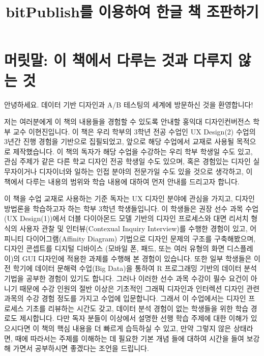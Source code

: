 \documentclass[
  letterpaper,
  DIV=11,
  numbers=noendperiod]{scrreprt}
\title{bitPublish를 이용하여 한글 책 조판하기}
\author{}
\date{}
\renewcommand*\contentsname{목차}
\newcommand\contentsname{목차}
\begin{document}
\maketitle

\renewcommand*\contentsname{목차}
{
\hypersetup{linkcolor=}
\setcounter{tocdepth}{2}
\tableofcontents
}


\chapter{머릿말: 이 책에서 다루는 것과 다루지 않는
것}\label{uxba38uxb9bfuxb9d0-uxc774-uxcc45uxc5d0uxc11c-uxb2e4uxb8e8uxb294-uxac83uxacfc-uxb2e4uxb8e8uxc9c0-uxc54auxb294-uxac83}

안녕하세요. 데이터 기반 디자인과 A/B 테스팅의 세계에 방문하신 것을
환영합니다!

저는 여러분에게 이 책의 내용들을 경험할 수 있도록 안내할 홍익대
디자인컨버전스 학부 교수 이현진입니다. 이 책은 우리 학부의 3학년 전공
수업인 UX Design(2) 수업의 3년간 진행 경험을 기반으로 집필되었고, 앞으로
해당 수업에서 교재로 사용될 목적으로 제작했습니다. 이 책의 독자가 해당
수업을 수강하는 우리 학부 학생일 수도 있고, 관심 주제가 같은 다른 학교
디자인 전공 학생일 수도 있으며, 혹은 경험있는 디자인 실무자이거나
디자이너와 일하는 인접 분야의 전문가일 수도 있을 것으로 생각하고, 이
책에서 다루는 내용의 범위와 학습 내용에 대하여 먼저 안내를 드리고자
합니다.

이 책을 수업 교재로 사용하는 기준 독자는 UX 디자인 분야에 관심을 가지고,
디자인 방법론을 학습하고자 하는 학부 3학년 학생들입니다. 이 학생들은
권장 선수 과목 수업(UX Design(1))에서 더블 다이아몬드 모델 기반의 디자인
프로세스와 대면 리서치 형식의 사용자 관찰 및 인터뷰(Contexual Inquiry
Interview)를 수행한 경험이 있고, 어피니티 다이어그램(Affinity Diagram)
기법으로 디자인 문제의 구조를 구축해봤으며, 디자인 콘셉트를 디지털
디바이스 (모바일 폰, 패드, 또는 여러 유형의 화면 디스플레이)의 GUI
디자인에 적용한 과제를 수행해 본 경험이 있습니다. 또한 일부 학생들은
이전 학기에 데이터 문해력 수업(Big Data)을 통하여 R 프로그래밍 기반의
데이터 분석 기법을 공부한 경험이 있기도 합니다. 그러나 이러한 선수 과목
수강이 필수 요건이 아니기 때문에 수강 인원의 절반 이상은 기초적인 그래픽
디자인과 인터렉션 디자인 관련 과목의 수강 경험 정도를 가지고 수업에
입문합니다. 그래서 이 수업에서는 디자인 프로세스 기초를 리뷰하는 시간도
갖고, 데이터 분석 경험이 없는 학생들을 위한 학습 경로도 제시합니다. 다만
독자 분들이 이상에서 설명한 선행 학습 주제에 대한 이해가 있으시다면 이
책의 핵심 내용을 더 빠르게 습득하실 수 있고, 만약 그렇지 않은 상태라면,
때에 따라서는 주제를 이해하는 데 필요한 기본 개념 들에 대하여 시간을
들여 보강해 가면서 공부하시면 좋겠다는 조언을 드립니다.
\end{document}
